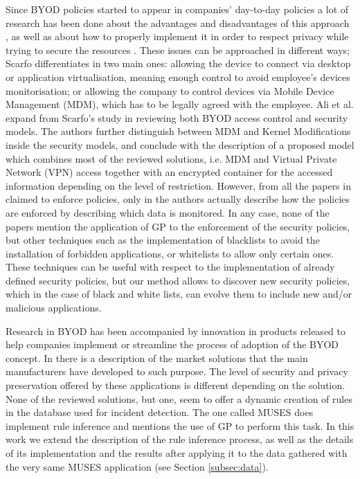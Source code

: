 \documentclass[a4paper,10pt,twocolumn,preprint,3p]{elsarticle}
\begin{document}
Since BYOD policies started to appear in companies' day-to-day policies  a lot
of research has been done about the advantages and disadvantages of
this approach \cite{singh2012byod}, as well as about how to properly implement it in order to
respect privacy while trying to secure the resources \cite{scarfo2012new, ali2015analysis, de2015corporate}.
These issues can be approached in different ways; Scarfo
differentiates in \cite{scarfo2012new} two main ones: allowing the
device to connect via desktop or application virtualisation, meaning
enough control to avoid employee's devices monitorisation; or allowing
the company to control devices
via Mobile Device Management (MDM), which has to be legally agreed
with the employee. %
 Ali et al. expand from Scarfo's study in
\cite{ali2015analysis} reviewing both BYOD access control
 and security models. The authors further distinguish
between MDM and Kernel Modifications inside the security models, and
conclude with the description of a proposed model which combines most
of the reviewed solutions, i.e. MDM and Virtual Private Network (VPN)
access together with an encrypted container for the accessed
information depending on the level of restriction. However, from all
the papers in \cite{ali2015analysis} claimed to enforce policies, only
in \cite{rhee2013high} the authors actually describe how the policies
are enforced by describing which data is monitored. In any case, none
of the papers mention the application of GP to the enforcement of the
security policies, but other techniques such as the implementation of
blacklists to avoid the installation of forbidden applications, or
whitelists to allow only certain ones. These techniques can be useful
with respect to the implementation of already defined security
policies, but our method allows to discover new security policies,
which in the case of black and white lists, can evolve them to include
new and/or malicious applications. 

Research in BYOD has been accompanied by innovation in products released
to help companies implement or streamline the process of adoption of the BYOD
concept. In \cite{de2015corporate} there is a description of the
market solutions that the main manufacturers have developed to such
purpose. The level of security and privacy preservation offered by
these applications is different depending on the solution.
None of the reviewed solutions, but one, seem to offer a dynamic
creation of rules in the database used for incident detection. The one
called MUSES does implement rule inference and mentions the use of GP
to perform this task. In this work we extend the description of the
rule inference process, as well as the details of its implementation
and the results after applying it to the data gathered with the very
same MUSES application (see Section \ref{subsec:data}). 
\end{document}
